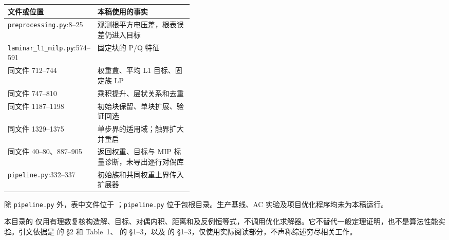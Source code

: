 \begin{table}[htbp]
\centering\small
\begin{tabularx}{\linewidth}{@{}p{0.42\linewidth}X@{}}
\toprule
文件或位置 & 本稿使用的事实\\
\midrule
\texttt{preprocessing.py}:8--25 & 观测根平方电压差，根表误差仍进入目标\\
\texttt{laminar\_l1\_milp.py}:574--591 & 固定块的 P/Q 特征\\
同文件 712--744 & 权重盒、平均 L1 目标、固定族 LP\\
同文件 747--810 & 乘积提升、层状关系和去重\\
同文件 1187--1198 & 初始块保留、单块扩展、验证回选\\
同文件 1329--1375 & 单步界的适用域；触界扩大并重启\\
同文件 40--80、887--905 & 返回权重、目标与 MIP 标量诊断，未导出逐行对偶库\\
\texttt{pipeline.py}:332--337 & 初始族和共同权重上界传入扩展器\\
\bottomrule
\end{tabularx}
\end{table}

除 \texttt{pipeline.py} 外，表中文件位于 ；\texttt{pipeline.py} 位于包根目录。生产基线、AC 实验及项目优化程序均未为本稿运行。

本目录的  仅用有理数复核构造解、目标、对偶内积、距离和及反例恒等式，不调用优化求解器。它不替代一般定理证明，也不是算法性能实验。引文依据是 \citet{bravo2009} 的 \S2 和 Table~1、\citet{fercoq2015} 的 \S1--3，以及 \citet{mihaescu2007} 的 \S1--3，仅使用实际阅读部分，不声称综述穷尽相关工作。
